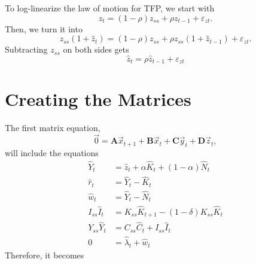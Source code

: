 \documentclass[11pt]{article}
\numberwithin{equation}{section} %
\numberwithin{figure}{section} %
\numberwithin{table}{section} %
\theoremstyle{definition}
\begin{document}
To log-linearize the law of motion for TFP, we start with
\[
    z_t = (1-\rho) z_{ss} + \rho z_{t-1} + \varepsilon_{zt}.
\]
Then, we turn it into
\[
    z_{ss}(1 + \hat{z}_t) = (1-\rho) z_{ss} + \rho z_{ss} (1 + \hat{z}_{t-1}) + \varepsilon_{zt}.
\]
Subtracting $z_{ss}$ on both sides gets
\[
    \hat{z}_t = \rho \hat{z}_{t-1} + \varepsilon_{zt}
\]


\section{Creating the Matrices} \label{sec:mat}

The first matrix equation,
\[
    \vec{0} = \mathbf{A} \vec{x}_{t+1} + \mathbf{B} \vec{x}_t + \mathbf{C} \vec{y}_t + \mathbf{D} \vec{z}_t,
\]
will include the equations
\begin{align*}
    \hat{Y}_t &= \hat{z}_t + \alpha \hat{K}_t + (1-\alpha) \hat{N}_t \\
    \hat{r}_t &= \hat{Y}_t - \hat{K}_t \\
    \hat{w}_t &= \hat{Y}_t - \hat{N}_t \\
    I_{ss} \hat{I}_t &= K_{ss} \hat{K}_{t + 1} - (1 - \delta) K_{ss} \hat{K}_t \\
    Y_{ss} \hat{Y}_t &= C_{ss} \hat{C}_t + I_{ss} \hat{I}_t \\
    0 &= \hat{\lambda}_t + \hat{w}_t
\end{align*}
Therefore, it becomes
\end{document}
